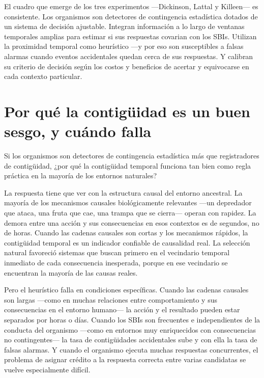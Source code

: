 \documentclass[
  letterpaper,
  DIV=11,
  numbers=noendperiod]{scrreprt}
\begin{document}
\begin{tcolorbox}[enhanced jigsaw, arc=.35mm, bottomrule=.15mm, breakable, colback=white, colframe=quarto-callout-note-color-frame, left=2mm, leftrule=.75mm, opacityback=0, rightrule=.15mm, toprule=.15mm]
El cuadro que emerge de los tres experimentos ---Dickinson, Lattal y
Killeen--- es consistente. Los organismos son detectores de contingencia
estadística dotados de un sistema de decisión ajustable. Integran
información a lo largo de ventanas temporales amplias para estimar si
sus respuestas covarian con los SBIs. Utilizan la proximidad temporal
como heurístico ---y por eso son susceptibles a falsas alarmas cuando
eventos accidentales quedan cerca de sus respuestas. Y calibran su
criterio de decisión según los costos y beneficios de acertar y
equivocarse en cada contexto particular.

\section{Por qué la contigüidad es un buen sesgo, y cuándo
falla}\label{por-quuxe9-la-contiguxfcidad-es-un-buen-sesgo-y-cuuxe1ndo-falla}

Si los organismos son detectores de contingencia estadística más que
registradores de contigüidad, ¿por qué la contigüidad temporal funciona
tan bien como regla práctica en la mayoría de los entornos naturales?

La respuesta tiene que ver con la estructura causal del entorno
ancestral. La mayoría de los mecanismos causales biológicamente
relevantes ---un depredador que ataca, una fruta que cae, una trampa que
se cierra--- operan con rapidez. La demora entre una acción y sus
consecuencias en esos contextos es de segundos, no de horas. Cuando las
cadenas causales son cortas y los mecanismos rápidos, la contigüidad
temporal es un indicador confiable de causalidad real. La selección
natural favoreció sistemas que buscan primero en el vecindario temporal
inmediato de cada consecuencia inesperada, porque en ese vecindario se
encuentran la mayoría de las causas reales.

Pero el heurístico falla en condiciones específicas. Cuando las cadenas
causales son largas ---como en muchas relaciones entre comportamiento y
sus consecuencias en el entorno humano--- la acción y el resultado
pueden estar separados por horas o días. Cuando los SBIs son frecuentes
e independientes de la conducta del organismo ---como en entornos muy
enriquecidos con consecuencias no contingentes--- la tasa de
contigüidades accidentales sube y con ella la tasa de falsas alarmas. Y
cuando el organismo ejecuta muchas respuestas concurrentes, el problema
de asignar crédito a la respuesta correcta entre varias candidatas se
vuelve especialmente difícil.


\end{tcolorbox}
\end{document}
